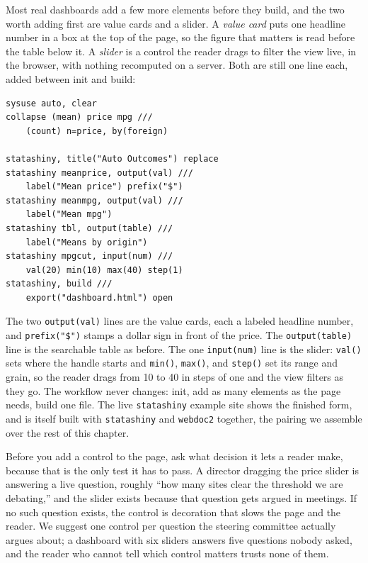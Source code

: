 Most real dashboards add a few more elements before they build, and the two worth adding first are value cards and a slider. A \emph{value card} puts one headline number in a box at the top of the page, so the figure that matters is read before the table below it. A \emph{slider} is a control the reader drags to filter the view live, in the browser, with nothing recomputed on a server. Both are still one line each, added between init and build:
\par
{\footnotesize
\begin{verbatim}
sysuse auto, clear
collapse (mean) price mpg ///
    (count) n=price, by(foreign)

statashiny, title("Auto Outcomes") replace
statashiny meanprice, output(val) ///
    label("Mean price") prefix("$")
statashiny meanmpg, output(val) ///
    label("Mean mpg")
statashiny tbl, output(table) ///
    label("Means by origin")
statashiny mpgcut, input(num) ///
    val(20) min(10) max(40) step(1)
statashiny, build ///
    export("dashboard.html") open
\end{verbatim}
}
The two \texttt{output(val)} lines are the value cards, each a labeled headline number, and \texttt{prefix("\$")} stamps a dollar sign in front of the price. The \texttt{output(table)} line is the searchable table as before. The one \texttt{input(num)} line is the slider: \texttt{val()} sets where the handle starts and \texttt{min()}, \texttt{max()}, and \texttt{step()} set its range and grain, so the reader drags from 10 to 40 in steps of one and the view filters as they go. The workflow never changes: init, add as many elements as the page needs, build one file. The live \texttt{statashiny} example site shows the finished form, and is itself built with \texttt{statashiny} and \texttt{webdoc2} together, the pairing we assemble over the rest of this chapter.

Before you add a control to the page, ask what decision it lets a reader make, because that is the only test it has to pass. A director dragging the price slider is answering a live question, roughly \enquote{how many sites clear the threshold we are debating,} and the slider exists because that question gets argued in meetings. If no such question exists, the control is decoration that slows the page and the reader. We suggest one control per question the steering committee actually argues about; a dashboard with six sliders answers five questions nobody asked, and the reader who cannot tell which control matters trusts none of them.


